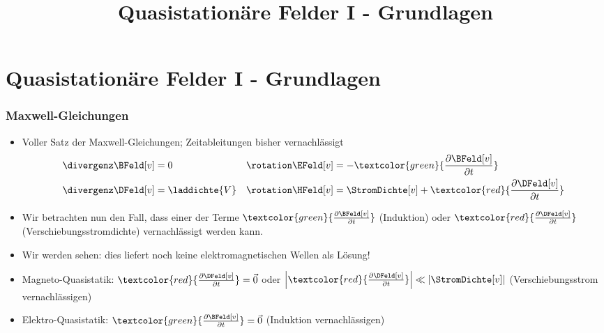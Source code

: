 

\title[TET: Quasistationäre Felder I - Grundlagen]{Quasistationäre Felder I - Grundlagen}


% 
% 

\maketitle

% 
% 
\section{Quasistationäre Felder I - Grundlagen}

\begin{frame}

  \frametitle{Maxwell-Gleichungen}

  \begin{itemize}[<+->]
  \item Voller Satz der Maxwell-Gleichungen; Zeitableitungen bisher vernachlässigt
\begin{align*}
	\divergenz \BFeld[v] &= 0 & \rotation \EFeld[v] &= - \textcolor{green}{\dfrac{\partial \BFeld[v]}{\partial t}} \\
	\divergenz \DFeld[v] &= \laddichte{V} & \rotation \HFeld[v] &= \StromDichte[v] + \textcolor{red}{\dfrac{\partial \DFeld[v]}{\partial t}}
\end{align*}
\item Wir betrachten nun den Fall, dass \alert{einer} der Terme $\textcolor{green}{\frac{\partial \BFeld[v]}{\partial t}}$ (Induktion) oder $\textcolor{red}{\frac{\partial \DFeld[v]}{\partial t}}$ (Verschiebungsstromdichte) vernachlässigt werden kann.
\item Wir werden sehen: dies liefert noch \alert{keine elektromagnetischen Wellen} als Lösung!
  \item \alert{Magneto-Quasistatik}: $\textcolor{red}{\frac{\partial \DFeld[v]}{\partial t}} = \vec{0}$ oder $\left|\textcolor{red}{\frac{\partial \DFeld[v]}{\partial t}}\right|\ll |\StromDichte[v]|$ (Verschiebungsstrom vernachlässigen)
\item \alert{Elektro-Quasistatik}: $\textcolor{green}{\frac{\partial \BFeld[v]}{\partial t}}=\vec{0}$ (Induktion vernachlässigen) 
  \end{itemize}
\end{frame}

